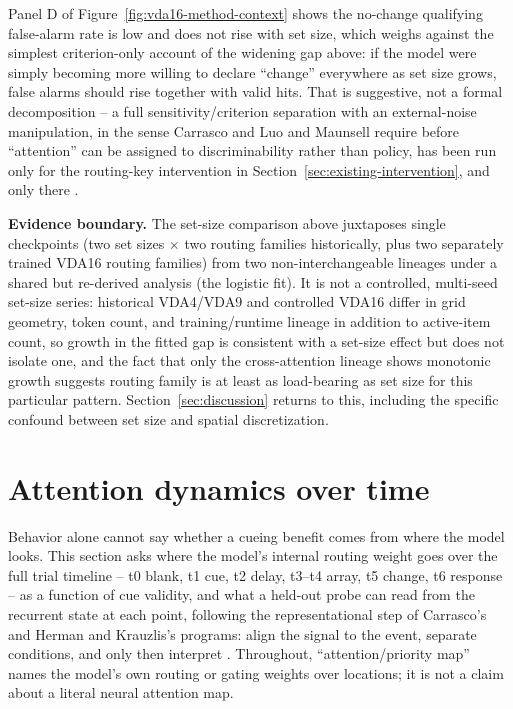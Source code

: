 \documentclass[11pt,a4paper]{article}
\newcommand{\boundary}[1]{\par\smallskip\noindent\colorbox{VdaLight}{\parbox{0.96\linewidth}{\textbf{Evidence boundary.} #1}}\par\smallskip}
\begin{document}
Panel D of Figure~\ref{fig:vda16-method-context} shows the no-change qualifying false-alarm rate is low and does not rise with set size, which weighs against the simplest criterion-only account of the widening gap above: if the model were simply becoming more willing to declare ``change'' everywhere as set size grows, false alarms should rise together with valid hits. That is suggestive, not a formal decomposition -- a full sensitivity/criterion separation with an external-noise manipulation, in the sense Carrasco and Luo and Maunsell require before ``attention'' can be assigned to discriminability rather than policy, has been run only for the routing-key intervention in Section~\ref{sec:existing-intervention}, and only there \cite{carrasco2011,luo2018}.

\boundary{The set-size comparison above juxtaposes single checkpoints (two set sizes $\times$ two routing families historically, plus two separately trained VDA16 routing families) from two non-interchangeable lineages under a shared but re-derived analysis (the logistic fit). It is not a controlled, multi-seed set-size series: historical VDA4/VDA9 and controlled VDA16 differ in grid geometry, token count, and training/runtime lineage in addition to active-item count, so growth in the fitted gap is consistent with a set-size effect but does not isolate one, and the fact that only the cross-attention lineage shows monotonic growth suggests routing family is at least as load-bearing as set size for this particular pattern. Section~\ref{sec:discussion} returns to this, including the specific confound between set size and spatial discretization.}

\section{Attention dynamics over time}\label{sec:attention-dynamics}
Behavior alone cannot say whether a cueing benefit comes from where the model looks. This section asks where the model's internal routing weight goes over the full trial timeline -- t0 blank, t1 cue, t2 delay, t3--t4 array, t5 change, t6 response -- as a function of cue validity, and what a held-out probe can read from the recurrent state at each point, following the representational step of Carrasco's and Herman and Krauzlis's programs: align the signal to the event, separate conditions, and only then interpret \cite{carrasco2011,herman2017}. Throughout, ``attention/priority map'' names the model's own routing or gating weights over locations; it is not a claim about a literal neural attention map.
\end{document}
